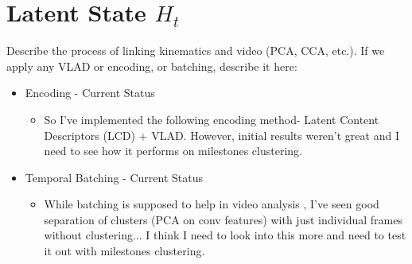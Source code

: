 \section{Latent State $H_t$}
Describe the process of linking kinematics and video (PCA, CCA, etc.).
If we apply any VLAD or encoding, or batching, describe it here:

\begin{itemize}
\item Encoding - Current Status
\begin{itemize}
\item So I've implemented the following encoding method- Latent Content Descriptors (LCD) + VLAD. However, initial results weren't great and I need to see how it performs on milestones clustering.
\end{itemize}

\item Temporal Batching - Current Status
\begin{itemize}
\item While batching is supposed to help in video analysis , I've seen good separation of clusters (PCA on conv features) with just individual frames without clustering... I think I need to look into this more and need to test it out with milestones clustering.
\end{itemize}

\end{itemize}
